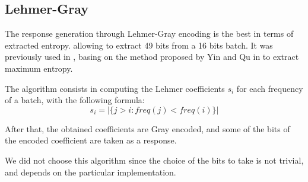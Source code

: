 \subsection{Lehmer-Gray}
\label{subsec:lehmer}

The response generation through Lehmer-Gray encoding is the best in terms of extracted entropy.
allowing to extract 49 bits from a 16 bits batch. It was previously used in \cite{PUFKY}, basing on the method proposed
by Yin and Qu in \cite{YinQu} to extract maximum entropy.

The algorithm consists in computing the Lehmer coefficients $s_i$ for each frequency of a batch, with the following formula:\\

\begin{equation}
    \label{eq:lehmer_coeff}
    s_i = |\{j > i : freq(j)<freq(i)\}|
\end{equation}

After that, the obtained coefficients are Gray encoded, and some of the bits of the encoded coefficient are taken as a response.

We did not choose this algorithm since the choice of the bits to take is not trivial, and depends on the particular implementation.
